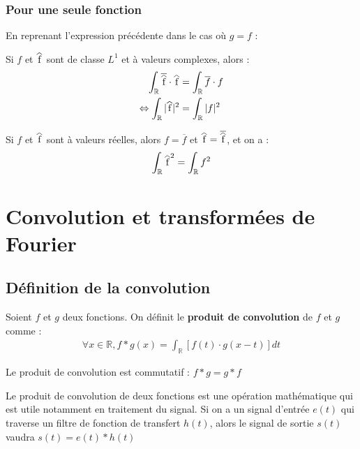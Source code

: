 \documentclass[12pt, a4paper]{article}
\newcommand\reallywidehat[1]{%
\savestack{\tmpbox}{\stretchto{%
  \scaleto{%
    \scalerel*[\widthof{\ensuremath{#1}}]{\kern-.6pt\bigwedge\kern-.6pt}%
    {\rule[-\textheight/2]{1ex}{\textheight}}%
  }{\textheight}%
}{0.5ex}}%
\stackon[1pt]{#1}{\tmpbox}%
}
\begin{document}
\subsubsection{Pour une seule fonction}

En reprenant l'expression précédente dans le cas où $g = f$ :

\begin{tcolorbox}
	Si $f$ et $\reallywidehat{f}$ sont de classe $L^1$ et à valeurs complexes, alors :
	\begin{equation*}
		\begin{aligned}
			\int_{\mathbb{R}} \overline{\reallywidehat{f}} \cdot \reallywidehat{f} & = \int_{\mathbb{R}} \overline{f} \cdot f \\
			\Leftrightarrow \int_{\mathbb{R}} |\reallywidehat{f}|^2 & = \int_{\mathbb{R}} |f|^2
		\end{aligned}
	\end{equation*}
	
	Si $f$ et $\reallywidehat{f}$ sont à valeurs réelles, alors $f = \overline{f}$ et $\reallywidehat{f} = \overline{\reallywidehat{f}}$, et on a :
	\begin{equation*}
		\int_{\mathbb{R}} \reallywidehat{f}^2 = \int_{\mathbb{R}} f^2
	\end{equation*}
\end{tcolorbox}

\section{Convolution et transformées de Fourier}

\subsection{Définition de la convolution}

\begin{tcolorbox}
	Soient $f$ et $g$ deux fonctions. On définit le \textbf{produit de convolution} de $f$ et $g$ comme :
	\begin{equation*}
		\begin{aligned}
			\forall x \in \mathbb{R}, f*g(x) = \int_{\mathbb{R}} \left[ f(t) \cdot g(x-t) \right]dt
		\end{aligned}
	\end{equation*}
	
	Le produit de convolution est commutatif : $f*g = g*f$
\end{tcolorbox}


Le produit de convolution de deux fonctions est une opération mathématique qui est utile notamment en traitement du signal. Si on a un signal d'entrée $e(t)$ qui traverse un filtre de fonction de transfert $h(t)$, alors le signal de sortie $s(t)$ vaudra $s(t) = e(t) * h(t)$
\end{document}
